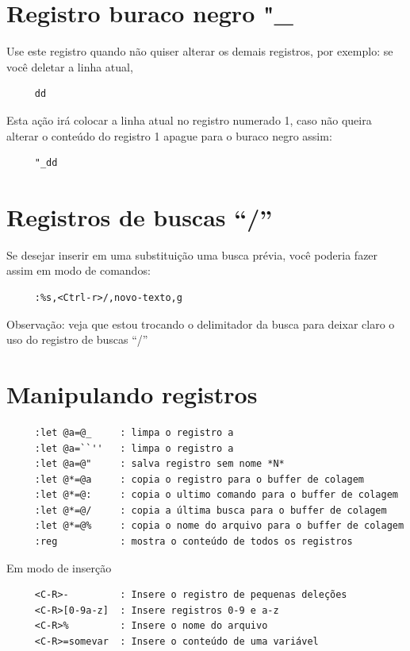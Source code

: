 \documentclass[10pt,a4paper,openany]{book}
\begin{document}
\section{Registro buraco negro "\_}
\label{Registro buraco negro}
Use este registro quando não quiser alterar os demais registros, por exemplo: se você deletar a linha atual,

\begin{verbatim}
     dd
\end{verbatim}

Esta ação irá colocar a linha atual no registro numerado 1, caso não
queira alterar o conteúdo do registro 1 apague para o buraco negro
assim:

\begin{verbatim}
     "_dd
\end{verbatim}

\section{Registros de buscas ``/''}
\label{Registros de buscas ``/''}

Se desejar inserir em uma substituição uma busca prévia, você poderia
fazer assim em modo de comandos:

\begin{verbatim}
     :%s,<Ctrl-r>/,novo-texto,g
\end{verbatim}

Observação: veja que estou trocando o delimitador da busca para deixar
claro o uso do registro de buscas ``/''

\section{Manipulando registros}
\label{Manipulando registros}

\begin{verbatim}
     :let @a=@_     : limpa o registro a
     :let @a=``''   : limpa o registro a
     :let @a=@"     : salva registro sem nome *N*
     :let @*=@a     : copia o registro para o buffer de colagem
     :let @*=@:     : copia o ultimo comando para o buffer de colagem
     :let @*=@/     : copia a última busca para o buffer de colagem
     :let @*=@%     : copia o nome do arquivo para o buffer de colagem
     :reg           : mostra o conteúdo de todos os registros
\end{verbatim}

Em modo de inserção

\begin{verbatim}
     <C-R>-         : Insere o registro de pequenas deleções
     <C-R>[0-9a-z]  : Insere registros 0-9 e a-z
     <C-R>%         : Insere o nome do arquivo
     <C-R>=somevar  : Insere o conteúdo de uma variável
\end{verbatim}
\end{document}
